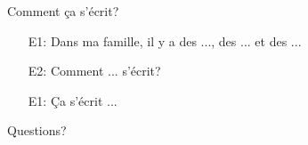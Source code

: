 \documentclass{beamer}
\begin{document}
  \begin{frame}{Comment ça s'écrit? }
    \begin{itemize}
      \item[E1:] Dans ma famille, il y a des ..., des ... et des ...
      \item[E2:] Comment ... s'écrit?
      \item[E1:] Ça s'écrit ...
    \end{itemize}
  \end{frame}

  \begin{frame}{}
    \begin{center}
      \Large Questions?
    \end{center}
  \end{frame}
\end{document}
